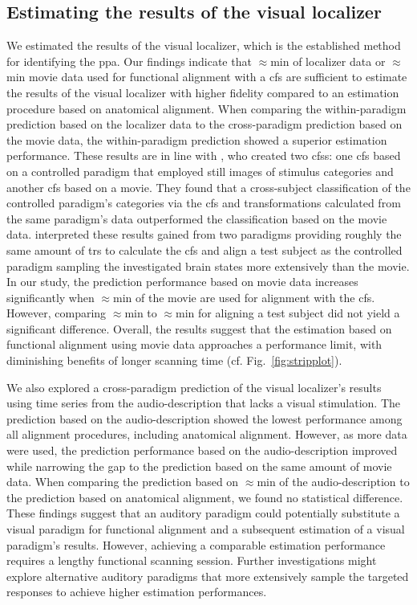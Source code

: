 \subsection{Estimating the results of the visual localizer}

We estimated the results of the visual localizer, which is the established
method for identifying the \ac{ppa}.
%
Our findings indicate that $\approx$\unit[15]{min} of localizer data or
$\approx$\unit[15]{min} movie data used for functional alignment with a \ac{cfs}
are sufficient to estimate the results of the visual localizer with higher
fidelity compared to an estimation procedure based on anatomical alignment.
%
When comparing the within-paradigm prediction based on the localizer data to the
cross-paradigm prediction based on the movie data, the within-paradigm
prediction showed a superior estimation performance.
%
These results are in line with \citep{haxby2011common}, who created two
\acp{cfs}:
%
one \ac{cfs} based on a controlled paradigm that employed still images of
stimulus categories and another \ac{cfs} based on a movie.
%
They found that a cross-subject classification of the controlled paradigm's
categories via the \ac{cfs} and transformations calculated from the same
paradigm's data outperformed the classification based on the movie data.
%
\citet{haxby2011common} interpreted these results gained from two paradigms
providing roughly the same amount of \acp{tr} to calculate the \ac{cfs} and
align a test subject as the controlled paradigm sampling the investigated brain
states more extensively than the movie.
%
In our study, the prediction performance based on movie data increases
significantly when $\approx$\unit[30]{min} of the movie are used for alignment
with the \ac{cfs}.
%
However, comparing $\approx$\unit[30]{min} to $\approx$\unit[45]{min} for
aligning a test subject did not yield a significant difference.
%
Overall, the results suggest that the estimation based on functional alignment
using movie data approaches a performance limit, with diminishing benefits of
longer scanning time (cf. Fig.~\ref{fig:stripplot}).

%
We also explored a cross-paradigm prediction of the visual localizer's results
using time series from the audio-description that lacks a visual stimulation.
%
The prediction based on the audio-description showed the lowest performance
among all alignment procedures, including anatomical alignment.
%
However, as more data were used, the prediction performance based on the
audio-description improved while narrowing the gap to the prediction based on
the same amount of movie data.
%
When comparing the prediction based on $\approx$\unit[120]{min} of the
audio-description to the prediction based on anatomical alignment, we found no
statistical difference.
%
These findings suggest that an auditory paradigm could potentially substitute a
visual paradigm for functional alignment and a subsequent estimation of a visual
paradigm's results.
%
However, achieving a comparable estimation performance requires a lengthy
functional scanning session.
%
Further investigations might explore alternative auditory paradigms that more
extensively sample the targeted responses to achieve higher estimation
performances.


